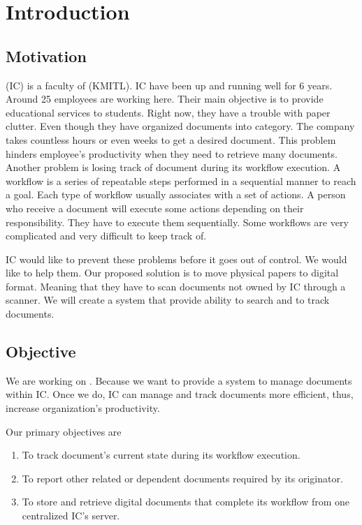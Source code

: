 \chapter{Introduction}

\section{Motivation}
\IC (IC) is a faculty of \kmitl (KMITL). 
IC have been up and running well for 6 years. 
Around 25 employees are working here. 
Their main objective is to provide educational services to students. 
Right now, they have a trouble with paper clutter. 
Even though they have organized documents into category. 
The company takes countless hours or even weeks to get a desired document. 
This problem hinders employee's productivity when they need to retrieve many documents. 
Another problem is losing track of document during its workflow execution. 
A workflow is a series of repeatable steps performed in a sequential manner to reach a goal.
Each type of workflow usually associates with a set of actions. 
A person who receive a document will execute some actions depending on their responsibility.
They have to execute them sequentially. 
Some workflows are very complicated and very difficult to keep track of.

IC would like to prevent these problems before it goes out of control. 
We would like to help them. 
Our proposed solution is to move physical papers to digital format. 
Meaning that they have to scan documents not owned by IC through a scanner. 
We will create a system that provide ability to search and to track documents.

\section{Objective}
We are working on \dms.
Because we want to provide a system to manage documents within IC.
Once we do, IC can manage and track documents more efficient, thus, increase organization's productivity.

Our primary objectives are
\begin{enumerate}
\item To track document's current state during its workflow execution.
\item To report other related or dependent documents required by its originator.
\item To store and retrieve digital documents that complete its workflow from one centralized IC's server.
\end{enumerate}

